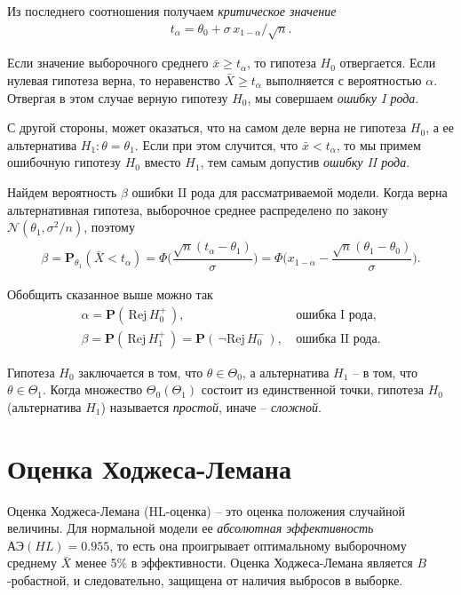 \documentclass[%
	11pt,
	a4paper,
	utf8,
		]{article}
\begin{document}
Из последнего соотношения получаем \emph{критическое значение}
\begin{align*}
	t_\alpha = \theta_0 + \sigma \, x_{1 - \alpha} / \sqrt{n}.
\end{align*}

Если значение выборочного среднего $ \bar{x} \geqslant t_\alpha$, то гипотеза $ H_0 $ отвергается. Если нулевая гипотеза верна, то неравенство $ \bar{X} \geqslant t_\alpha $ выполняется с вероятностью $ \alpha $. Отвергая в этом случае верную гипотезу $ H_0 $, мы совершаем \emph{ошибку I рода}.

С другой стороны, может оказаться, что на самом деле верна не гипотеза $ H_0 $, а ее альтернатива $ H_1 : \theta = \theta_1$. Если при этом случится, что $ \bar{x} < t_\alpha $, то мы примем ошибочную гипотезу $ H_0 $ вместо $ H_1 $, тем самым допустив \emph{ошибку II рода}.

Найдем вероятность $ \beta $ ошибки II рода для рассматриваемой модели. Когда верна альтернативная гипотеза, выборочное среднее распределено по закону $ \mathcal{N}(\theta_1, \sigma^2/n)$, поэтому
\begin{align*}
	\beta = \mathbf{P}_{\theta_1}(\bar{X} < t_\alpha) = \Phi \Bigg( \dfrac{ \sqrt{n}(t_\alpha - \theta_1) }{\sigma} \Bigg) = \Phi \Bigg( x_{1 - \alpha} - \dfrac{ \sqrt{n}(\theta_1 - \theta_0) }{\sigma} \Bigg).
\end{align*}

Обобщить сказанное выше можно так
\begin{align*}
	\alpha = \mathbf{P}(\,\text{Rej} \, H_0^+\,),\ &\text{ошибка I рода},\\
	\beta = \mathbf{P}(\,\text{Rej} \, H_1^+\,) = \mathbf{P}(\,\neg\text{Rej} \, H_0^-\,),\ &\text{ошибка II рода}.
\end{align*}

Гипотеза $ H_0 $ заключается в том, что $ \theta \in \Theta_0 $, а альтернатива $ H_1 $ -- в том, что $ \theta \in \Theta_1 $. Когда множество $ \Theta_0 (\Theta_1) $ состоит из единственной точки, гипотеза $ H_0 $ (альтернатива $ H_1 $) называется \emph{простой}, иначе -- \emph{сложной}.

\section{Оценка Ходжеса-Лемана}

Оценка Ходжеса-Лемана (HL-оценка) -- это оценка положения случайной величины. Для нормальной модели ее \emph{абсолютная эффективность} $ \text{АЭ}(HL) = 0.955 $, то есть она проигрывает оптимальному выборочному среднему $ \bar{X} $ менее 5\% в эффективности. Оценка Ходжеса-Лемана является $ B $-робастной, и следовательно, защищена от наличия выбросов в выборке. 
\end{document}
